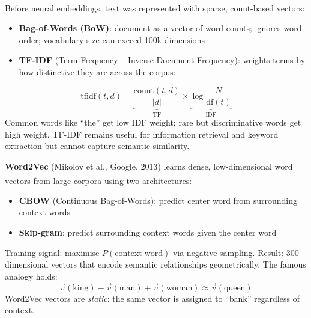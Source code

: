 \begin{tcbitemize}[ skin=sectionraster ]
    \tcbitem[title={Classical Text Representations}, raster multicolumn=3]
    Before neural embeddings, text was represented with sparse, count-based vectors\textsuperscript{\cite[][p.~34]{farrisHowLargeLanguage2025}}:
    \begin{itemize}
        \item \textbf{Bag-of-Words (BoW)}: document as a vector of word counts; ignores word order; vocabulary size can exceed 100k dimensions
        \item \textbf{TF-IDF} (Term Frequency -- Inverse Document Frequency): weights terms by how distinctive they are across the corpus:
    \end{itemize}
    \begin{equation}
        \mathrm{tfidf}(t, d) = \underbrace{\frac{\text{count}(t,d)}{|d|}}_{\text{TF}} \times \underbrace{\log\frac{N}{\text{df}(t)}}_{\text{IDF}}
    \end{equation}
    Common words like ``the'' get low IDF weight; rare but discriminative words get high weight.
    TF-IDF remains useful for information retrieval and keyword extraction but cannot capture semantic similarity.

    \tcbitem[title={Word2Vec: Learning Dense Embeddings}, raster multicolumn=3]
    \textbf{Word2Vec} (Mikolov et al., Google, 2013) learns dense, low-dimensional word vectors from large corpora using two architectures\textsuperscript{\cite[][p.~36]{farrisHowLargeLanguage2025}}:
    \begin{itemize}
        \item \textbf{CBOW} (Continuous Bag-of-Words): predict center word from surrounding context words
        \item \textbf{Skip-gram}: predict surrounding context words given the center word
    \end{itemize}
    Training signal: maximise $P(\text{context}|\text{word})$ via negative sampling.
    Result: 300-dimensional vectors that encode semantic relationships geometrically.
    The famous analogy holds:
    \begin{equation}
        \vec{v}(\text{king}) - \vec{v}(\text{man}) + \vec{v}(\text{woman}) \approx \vec{v}(\text{queen})
    \end{equation}
    Word2Vec vectors are \emph{static}: the same vector is assigned to ``bank'' regardless of context.


\end{tcbitemize}
